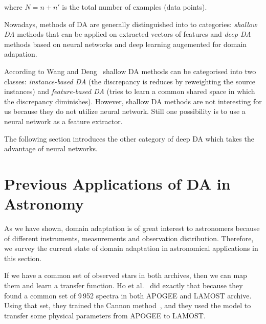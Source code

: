 where \(N = n + n'\) is the total number of examples (data points).

Nowadays, methods of DA are generally distinguished into to categories:
\textit{shallow DA} methods that can be applied on extracted vectors of features
and \textit{deep DA} methods based on neural networks and deep learning
augemented for domain adapation.~\cite{csurka2017}

According to Wang and Deng~\cite{wang2018} shallow DA methods
can be categorised into two classes:
\textit{instance-based DA}
(the discrepancy is reduces by reweighting the source instances)
and \textit{feature-based DA}
(tries to learn a common shared space in which the discrepancy diminishes).
However, shallow DA methods are not interesting for us
because they do not utilize neural network.
Still one possibility is to use a neural network as a feature extractor.~\cite{csurka2017}

The following section introduces the other category of deep DA
which takes the advantage of neural networks.

\section{Previous Applications of DA in Astronomy}


As we have shown, domain adaptation is of great interest to astronomers
because of different instruments, measurements and observation distribution.
Therefore, we survey the current state of domain adaptation in astronomical applications in this section.

If we have a common set of observed stars in both archives,
then we can map them and learn a transfer function.
Ho et al.~\cite{ho2017} did exactly that
because they found a common set of 9\,952 spectra in both APOGEE and LAMOST archive.
Using that set, they trained the Cannon method~\cite{ness2015},
and they used the model to transfer some physical parameters from APOGEE to LAMOST.

